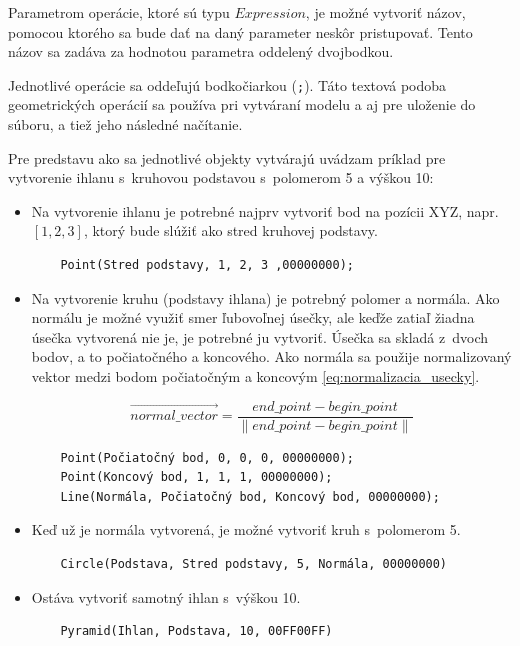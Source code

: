 Parametrom operácie, ktoré sú typu $Expression$, je možné vytvoriť názov, pomocou ktorého sa bude dať na daný parameter neskôr pristupovať. 
Tento názov sa zadáva za hodnotou parametra oddelený dvojbodkou.

Jednotlivé operácie sa oddeľujú bodkočiarkou (\texttt{;}). 
Táto textová podoba geometrických operácií sa používa pri vytváraní modelu a aj pre uloženie do súboru, a tiež jeho následné načítanie.

Pre predstavu ako sa jednotlivé objekty vytvárajú uvádzam príklad pre vytvorenie ihlanu s~kruhovou podstavou s~polomerom 5 a výškou 10:
\begin{itemize}
    \item Na vytvorenie ihlanu je potrebné najprv vytvoriť bod na pozícii XYZ, napr. $\left [ 1, 2, 3 \right ]$, ktorý bude slúžiť ako stred kruhovej podstavy.
	\begin{lstlisting}
	Point(Stred podstavy, 1, 2, 3 ,00000000);
	\end{lstlisting}
	\item Na vytvorenie kruhu (podstavy ihlana) je potrebný polomer a normála. Ako normálu je možné využiť smer ľubovoľnej úsečky, ale keďže zatiaľ žiadna úsečka vytvorená nie je, je potrebné ju vytvoriť. Úsečka sa skladá z~dvoch bodov, a to počiatočného a koncového. Ako normála sa použije normalizovaný vektor medzi bodom počiatočným a koncovým \ref{eq:normalizacia_usecky}.

	\begin{equation}
		\overrightarrow{normal\_vector}=
		\frac{end\_point - begin\_point}{
		\left \|  end\_point - begin\_point \right \|}
	\label{eq:normalizacia_usecky}
	\end{equation}

	\begin{lstlisting}
	Point(Počiatočný bod, 0, 0, 0, 00000000);
	Point(Koncový bod, 1, 1, 1, 00000000);
	Line(Normála, Počiatočný bod, Koncový bod, 00000000);
	\end{lstlisting}
	\item Keď už je normála vytvorená, je možné vytvoriť kruh s~polomerom 5.
	\begin{lstlisting}
	Circle(Podstava, Stred podstavy, 5, Normála, 00000000) 
	\end{lstlisting}
	\item Ostáva vytvoriť samotný ihlan s~výškou 10.
	\begin{lstlisting}
	Pyramid(Ihlan, Podstava, 10, 00FF00FF)
	\end{lstlisting}
\end{itemize}


